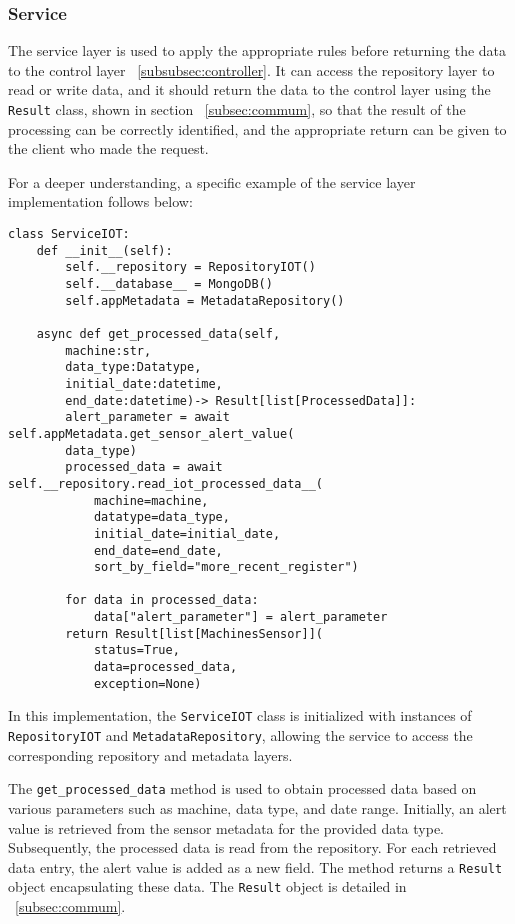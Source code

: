 \subsubsection{Service}\label{subsubsec:service}
The service layer is used to apply the appropriate rules before returning the data to the control layer ~\ref{subsubsec:controller}. It can access the repository layer to read or write data, and it should return the data to the control layer using the \texttt{Result} class, shown in section ~\ref{subsec:commum}, so that the result of the processing can be correctly identified, and the appropriate return can be given to the client who made the request.

For a deeper understanding, a specific example of the service layer implementation follows below:

\begin{Verbatim}[fontsize=\small, baselinestretch=0.6]
class ServiceIOT:
    def __init__(self):
        self.__repository = RepositoryIOT()
        self.__database__ = MongoDB()
        self.appMetadata = MetadataRepository()
            
    async def get_processed_data(self,
        machine:str,
        data_type:Datatype,
        initial_date:datetime,
        end_date:datetime)-> Result[list[ProcessedData]]:
        alert_parameter = await self.appMetadata.get_sensor_alert_value(
        data_type)
        processed_data = await self.__repository.read_iot_processed_data__(
            machine=machine,
            datatype=data_type,
            initial_date=initial_date,
            end_date=end_date,
            sort_by_field="more_recent_register")
        
        for data in processed_data:
            data["alert_parameter"] = alert_parameter
        return Result[list[MachinesSensor]](
            status=True,
            data=processed_data,
            exception=None)

\end{Verbatim}

In this implementation, the \texttt{ServiceIOT} class is initialized with instances of \texttt{RepositoryIOT} and \texttt{MetadataRepository}, allowing the service to access the corresponding repository and metadata layers.

The \texttt{get\_processed\_data} method is used to obtain processed data based on various parameters such as machine, data type, and date range. Initially, an alert value is retrieved from the sensor metadata for the provided data type. Subsequently, the processed data is read from the repository. For each retrieved data entry, the alert value is added as a new field. The method returns a \texttt{Result} object encapsulating these data. The \texttt{Result} object is detailed in ~\ref{subsec:commum}.

